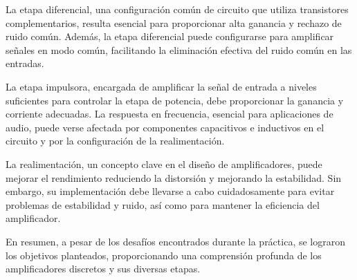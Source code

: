 La etapa diferencial, una configuración común de circuito que utiliza transistores complementarios, resulta esencial para proporcionar alta ganancia y rechazo de ruido común. Además, la etapa diferencial puede configurarse para amplificar señales en modo común, facilitando la eliminación efectiva del ruido común en las entradas.

La etapa impulsora, encargada de amplificar la señal de entrada a niveles suficientes para controlar la etapa de potencia, debe proporcionar la ganancia y corriente adecuadas. La respuesta en frecuencia, esencial para aplicaciones de audio, puede verse afectada por componentes capacitivos e inductivos en el circuito y por la configuración de la realimentación.

La realimentación, un concepto clave en el diseño de amplificadores, puede mejorar el rendimiento reduciendo la distorsión y mejorando la estabilidad. Sin embargo, su implementación debe llevarse a cabo cuidadosamente para evitar problemas de estabilidad y ruido, así como para mantener la eficiencia del amplificador.

En resumen, a pesar de los desafíos encontrados durante la práctica, se lograron los objetivos planteados, proporcionando una comprensión profunda de los amplificadores discretos y sus diversas etapas.

\newpage